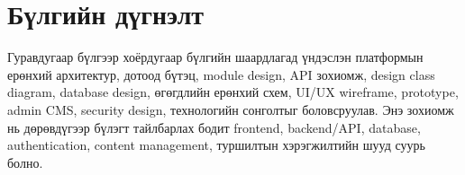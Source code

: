 \section*{Бүлгийн дүгнэлт}

Гуравдугаар бүлгээр хоёрдугаар бүлгийн шаардлагад үндэслэн платформын ерөнхий архитектур, дотоод бүтэц, module design, API зохиомж, design class diagram, database design, өгөгдлийн ерөнхий схем, UI/UX wireframe, prototype, admin CMS, security design, технологийн сонголтыг боловсруулав. Энэ зохиомж нь дөрөвдүгээр бүлэгт тайлбарлах бодит frontend, backend/API, database, authentication, content management, туршилтын хэрэгжилтийн шууд суурь болно.

